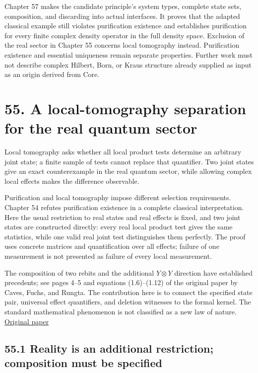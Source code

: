 \documentclass[
  11pt,
  oneside]{book}
\begin{document}
Chapter 57 makes the candidate principle's system types, complete state
sets, composition, and discarding into actual interfaces. It proves that
the adapted classical example still violates purification existence and
establishes purification for every finite complex density operator in
the full density space. Exclusion of the real sector in Chapter 55
concerns local tomography instead. Purification existence and essential
uniqueness remain separate properties. Further work must not describe
complex Hilbert, Born, or Kraus structure already supplied as input as
an origin derived from Core.

\chapter{55. A local-tomography separation for the real quantum
sector}\label{ch-55}

Local tomography asks whether all local product tests determine an
arbitrary joint state; a finite sample of tests cannot replace that
quantifier. Two joint states give an exact counterexample in the real
quantum sector, while allowing complex local effects makes the
difference observable.

Purification and local tomography impose different selection
requirements. Chapter 54 refutes purification existence in a complete
classical interpretation. Here the usual restriction to real states and
real effects is fixed, and two joint states are constructed directly:
every real local product test gives the same statistics, while one valid
real joint test distinguishes them perfectly. The proof uses concrete
matrices and quantification over all effects; failure of one measurement
is not presented as failure of every local measurement.

The composition of two rebits and the additional \(Y\otimes Y\)
direction have established precedents; see pages 4--5 and equations
(1.6)--(1.12) of the original paper by Caves, Fuchs, and Rungta. The
contribution here is to connect the specified state pair, universal
effect quantifiers, and deletion witnesses to the formal kernel. The
standard mathematical phenomenon is not classified as a new law of
nature. \href{https://arxiv.org/abs/quant-ph/0009063}{Original paper}

\section{55.1 Reality is an additional restriction; composition must be
specified}
\end{document}
